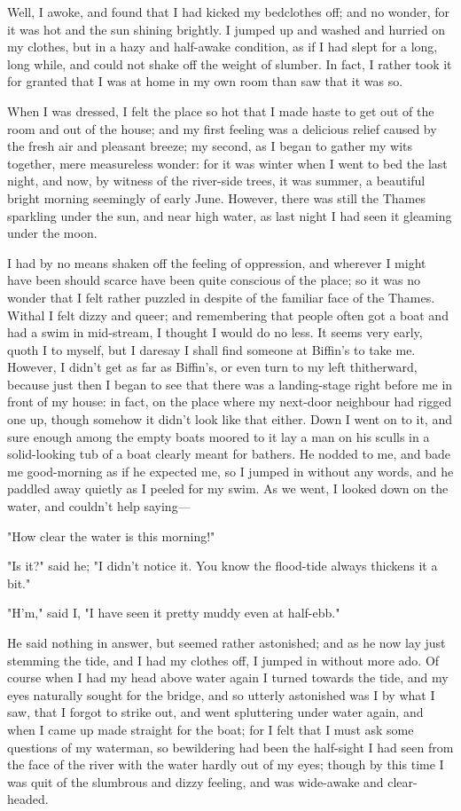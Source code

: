 Well, I awoke, and found that I had kicked my bedclothes off; and no
wonder, for it was hot and the sun shining brightly. I jumped up and
washed and hurried on my clothes, but in a hazy and half-awake
condition, as if I had slept for a long, long while, and could not shake
off the weight of slumber. In fact, I rather took it for granted that I
was at home in my own room than saw that it was so.

When I was dressed, I felt the place so hot that I made haste to get out
of the room and out of the house; and my first feeling was a delicious
relief caused by the fresh air and pleasant breeze; my second, as I
began to gather my wits together, mere measureless wonder: for it was
winter when I went to bed the last night, and now, by witness of the
river-side trees, it was summer, a beautiful bright morning seemingly of
early June. However, there was still the Thames sparkling under the sun,
and near high water, as last night I had seen it gleaming under the
moon.

I had by no means shaken off the feeling of oppression, and wherever I
might have been should scarce have been quite conscious of the place; so
it was no wonder that I felt rather puzzled in despite of the familiar
face of the Thames. Withal I felt dizzy and queer; and remembering that
people often got a boat and had a swim in mid-stream, I thought I would
do no less. It seems very early, quoth I to myself, but I daresay I
shall find someone at Biffin's to take me. However, I didn't get as far
as Biffin's, or even turn to my left thitherward, because just then I
began to see that there was a landing-stage right before me in front of
my house: in fact, on the place where my next-door neighbour had rigged
one up, though somehow it didn't look like that either. Down I went on
to it, and sure enough among the empty boats moored to it lay a man on
his sculls in a solid-looking tub of a boat clearly meant for bathers.
He nodded to me, and bade me good-morning as if he expected me, so I
jumped in without any words, and he paddled away quietly as I peeled for
my swim. As we went, I looked down on the water, and couldn't help
saying---

"How clear the water is this morning!"

"Is it?" said he; "I didn't notice it. You know the flood-tide always
thickens it a bit."

"H'm," said I, "I have seen it pretty muddy even at half-ebb."

He said nothing in answer, but seemed rather astonished; and as he now
lay just stemming the tide, and I had my clothes off, I jumped in
without more ado. Of course when I had my head above water again I
turned towards the tide, and my eyes naturally sought for the bridge,
and so utterly astonished was I by what I saw, that I forgot to strike
out, and went spluttering under water again, and when I came up made
straight for the boat; for I felt that I must ask some questions of my
waterman, so bewildering had been the half-sight I had seen from the
face of the river with the water hardly out of my eyes; though by this
time I was quit of the slumbrous and dizzy feeling, and was wide-awake
and clear-headed.

